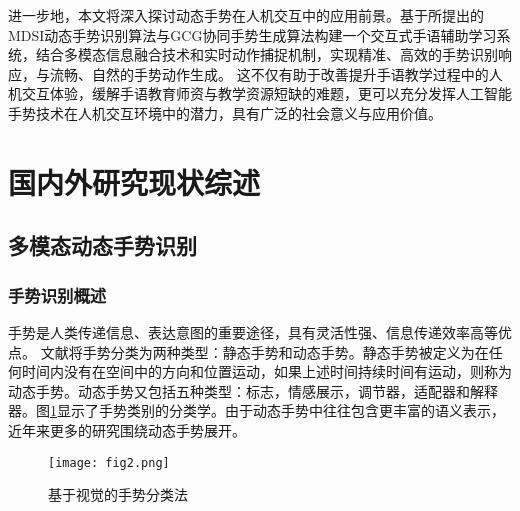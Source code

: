 进一步地，本文将深入探讨动态手势在人机交互中的应用前景。基于所提出的MDSI动态手势识别算法与GCG协同手势生成算法构建一个交互式手语辅助学习系统，结合多模态信息融合技术和实时动作捕捉机制，实现精准、高效的手势识别响应，与流畅、自然的手势动作生成。
这不仅有助于改善提升手语教学过程中的人机交互体验，缓解手语教育师资与教学资源短缺的难题\cite{2022signlearning}，更可以充分发挥人工智能手势技术在人机交互环境中的潜力，具有广泛的社会意义与应用价值。



\section{国内外研究现状综述}
\subsection{多模态动态手势识别}
\subsubsection{手势识别概述}
手势是人类传递信息、表达意图的重要途径，具有灵活性强、信息传递效率高等优点\cite{guo2021human}。
文献\cite{kaaniche2009gesture, rautaray2015vision}将手势分类为两种类型：静态手势和动态手势。静态手势被定义为在任何时间内没有在空间中的方向和位置运动，如果上述时间持续时间有运动，则称为动态手势。动态手势又包括五种类型\cite{ottenheimer2018anthropology}：标志，情感展示，调节器，适配器和解释器。图\ref{fig:gesture_taxonomies}显示了手势类别的分类学。由于动态手势中往往包含更丰富的语义表示，近年来更多的研究围绕动态手势展开。
\begin{figure}
  \centering
  \texttt{[image: fig2.png]}
  \caption{基于视觉的手势分类法\cite{rautaray2015vision}}
  \label{fig:gesture_taxonomies}
\end{figure}

